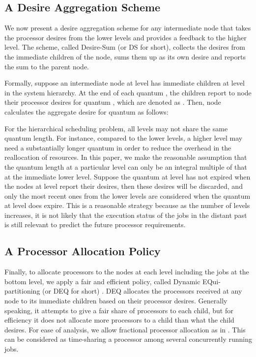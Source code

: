 \documentclass[10pt, a4paper]{article}
\begin{document}
\subsection{A Desire Aggregation Scheme}

We now present a desire aggregation scheme for any intermediate node that takes the processor
desires from the lower levels and provides a feedback to the higher level. The scheme, called
Desire-Sum (or DS for short), collects the desires from the immediate children of the node, sums
them up as its own desire and  reports the sum to the parent node.

Formally, suppose an intermediate node  at level  has  immediate children at level
 in the system hierarchy. At the end of each quantum , the  children report to node
 their processor desires for quantum , which are denoted as . Then, node  calculates the aggregate desire
 for quantum  as follows:


For the hierarchical scheduling problem, all levels may not share the same quantum length. For
instance, compared to the lower levels, a higher level may need a substantially longer quantum in
order to reduce the overhead in the reallocation of resources. In this paper, we make the
reasonable assumption that the quantum length at a particular level can only be an integral
multiple of that at the immediate lower level. Suppose the quantum at level  has not expired
when the nodes at level  report their desires, then these desires will be discarded, and only
the most recent ones from the lower levels are considered when the quantum at level  does
expire. This is a reasonable strategy because as the number of levels increases, it is not likely
that the execution status of the jobs in the distant past is still relevant to predict the future
processor requirements.

\subsection{A Processor Allocation Policy}

Finally, to allocate processors to the nodes at each level including the jobs at the bottom level,
we apply a fair and efficient policy, called Dynamic EQui-partitioning (or DEQ for short)
\cite{McCannVaZa93}. DEQ allocates the processors received at any node to its immediate children
based on their processor desires. Generally speaking, it attempts to give a fair share of
processors to each child, but for efficiency it does not allocate more processors to a child than
what the child desires. For ease of analysis, we allow fractional processor allocation as in
\cite{HeHsLe06,HeHsLe08,SunCaHs11,AgrawalLeHe08,SunCaHs09}. This can be considered as time-sharing
a processor among several concurrently running jobs.
\end{document}
